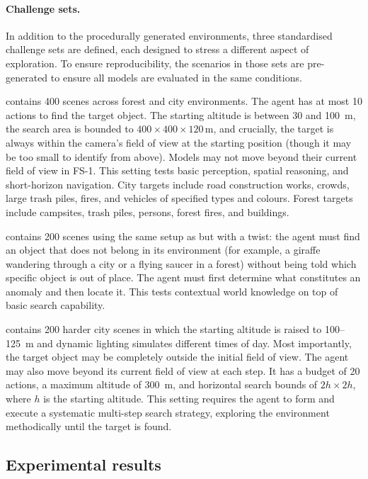 \paragraph{Challenge sets.} In addition to the procedurally generated environments, three standardised challenge sets are defined, each designed to stress a different aspect of exploration. To ensure reproducibility, the scenarios in those sets are pre-generated to ensure all models are evaluated in the same conditions.

\challenge{} contains 400 scenes across forest and city environments. The agent has at most 10 actions to find the target object. The starting altitude is between 30 and 100~m, the search area is bounded to $400\times400\times120\,\mathrm{m}$, and crucially, the target is always within the camera's field of view at the starting position (though it may be too small to identify from above). Models may not move beyond their current field of view in FS-1. This setting tests basic perception, spatial reasoning, and short-horizon navigation. City targets include road construction works, crowds, large trash piles, fires, and vehicles of specified types and colours. Forest targets include campsites, trash piles, persons, forest fires, and buildings.

\anomalychallenge{} contains 200 scenes using the same setup as \challenge{} but with a twist: the agent must find an object that does not belong in its environment (for example, a giraffe wandering through a city or a flying saucer in a forest) without being told which specific object is out of place. The agent must first determine what constitutes an anomaly and then locate it. This tests contextual world knowledge on top of basic search capability.

\hardchallenge{} contains 200 harder city scenes in which the starting altitude is raised to 100--125~m and dynamic lighting simulates different times of day. Most importantly, the target object may be completely outside the initial field of view. The agent may also move beyond its current field of view at each step. It has a budget of 20 actions, a maximum altitude of 300~m, and horizontal search bounds of $2h\times2h$, where $h$ is the starting altitude. This setting requires the agent to form and execute a systematic multi-step search strategy, exploring the environment methodically until the target is found.

\subsection{Experimental results}
\label{sec:flysearch-results}


